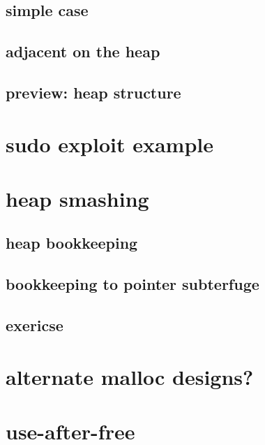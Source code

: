 \subsection{simple case}


\subsection{adjacent on the heap}


\subsection{preview: heap structure}


\section{sudo exploit example}



\section{heap smashing}


\subsection{heap bookkeeping}


\subsection{bookkeeping to pointer subterfuge}


\subsection{exericse}


\section{alternate malloc designs?}


\section{use-after-free}


